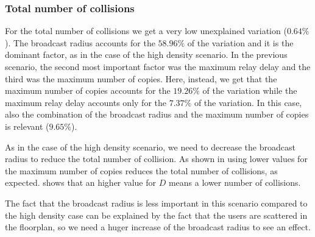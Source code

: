 \subsubsection{Total number of collisions}\label{subsubsec:ld2krcollisions}

For the total number of collisions we get a very low unexplained variation
(\(0.64\%\)). The broadcast radius accounts for the \(58.96\%\) of the variation
and it is the dominant factor, as in the case of the high density scenario. In
the previous scenario, the second most important factor was the maximum relay
delay and the third was the maximum number of copies. Here, instead, we get that
the maximum number of copies accounts for the \(19.26\%\) of the variation while
the maximum relay delay accounts only for the \(7.37\%\) of the variation. In
this case, also the combination of the broadcast radius and the maximum number
of copies is relevant (\(9.65\%\)).

As in the case of the high density scenario, we need to decrease the broadcast
radius to reduce the total number of collision. As shown in
 using lower values for the maximum number of
copies reduces the total number of collisions, as expected.
 shows that an higher value for \(D\) means
a lower number of collisions.

The fact that the broadcast radius is less important in this scenario compared
to the high density case can be explained by the fact that the users are
scattered in the floorplan, so we need a huger increase of the broadcast radius
to see an effect.

